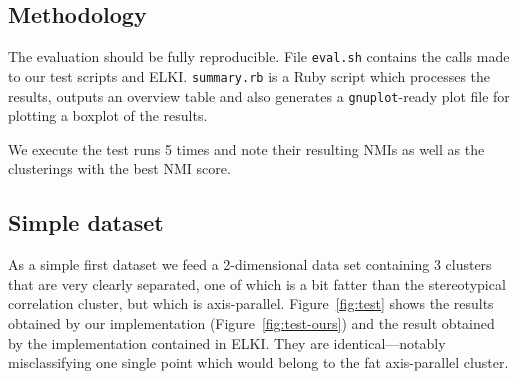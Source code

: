 \documentclass[english]{scrartcl}
\begin{document}
\subsection{Methodology}

The evaluation should be fully reproducible. File \texttt{eval.sh} contains the calls made to our
test scripts and ELKI. \texttt{summary.rb} is a Ruby script which processes the results, outputs
an overview table and also generates a \texttt{gnuplot}-ready plot file for plotting a boxplot of
the results.

We execute the test runs 5 times and note their resulting NMIs as well as the clusterings with the
best NMI score.

\subsection{Simple dataset}

As a simple first dataset we feed a 2-dimensional data set containing 3 clusters that are very clearly
separated, one of which is a bit fatter than the stereotypical correlation cluster, but which is
axis-parallel. Figure~\ref{fig:test} shows the results obtained by our implementation (Figure~\ref{fig:test-ours})
and the result obtained by the implementation contained in ELKI. They are identical---notably misclassifying one
single point which would belong to the fat axis-parallel cluster.
\end{document}

